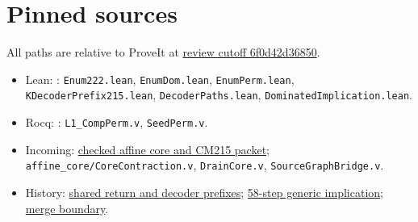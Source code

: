 \documentclass[10pt]{article}
\newcommand{\code}[1]{\texttt{#1}}
\begin{document}
\section*{Pinned sources}
\small
All paths are relative to ProveIt at \href{https://github.com/VladimirReshetnikov/ProveIt/commit/6f0d42d368506bc29c70ace1c992ed88b2651346}{review cutoff 6f0d42d36850}.
\begin{itemize}[leftmargin=*,nosep]
\item Lean: :
\code{Enum222.lean}, \code{EnumDom.lean}, \code{EnumPerm.lean},
\code{KDecoderPrefix215.lean}, \code{DecoderPaths.lean}, \code{DominatedImplication.lean}.
\item Rocq: :
\code{L1\_CompPerm.v}, \code{SeedPerm.v}.
\item Incoming: \href{https://github.com/VladimirReshetnikov/ProveIt/blob/6f0d42d368506bc29c70ace1c992ed88b2651346/docs/incoming/K215_Checked_Affine_Core_and_CM215_2026-10-21.zip}{checked affine core and CM215 packet};\newline 
\code{affine\_core/CoreContraction.v}, \code{DrainCore.v}, \code{SourceGraphBridge.v}.
\item History: \href{https://github.com/VladimirReshetnikov/ProveIt/commit/507ccc5db72bd8448347e928016bded6df084d04}{shared return and decoder prefixes};
\href{https://github.com/VladimirReshetnikov/ProveIt/commit/d93adc41745b28830efd865d2b9898be36988ef5}{58-step generic implication};
\href{https://github.com/VladimirReshetnikov/ProveIt/commit/2ca3a5c16f0876d2cab842056353c03a1ed2f5f0}{merge boundary}.
\end{itemize}
\end{document}
